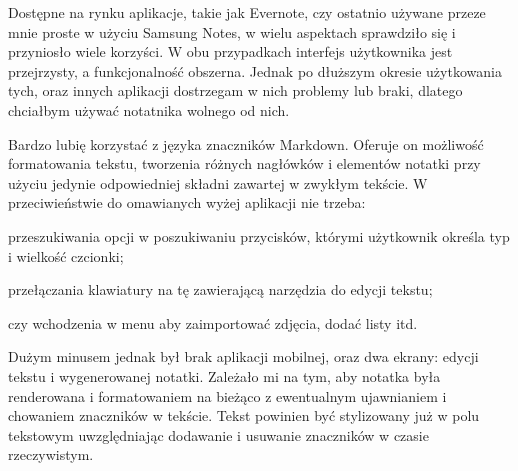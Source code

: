 \documentclass[shortabstract]{iithesis}
\begin{document}
Dostępne na rynku aplikacje, takie jak Evernote, czy ostatnio używane przeze mnie proste w użyciu Samsung Notes, w wielu aspektach sprawdziło się i przyniosło wiele korzyści. W obu przypadkach interfejs użytkownika jest przejrzysty, a funkcjonalność obszerna. Jednak po dłuższym okresie użytkowania tych, oraz innych aplikacji dostrzegam w nich problemy lub braki, dlatego chciałbym używać notatnika wolnego od nich.

Bardzo lubię korzystać z języka znaczników Markdown. Oferuje on możliwość formatowania tekstu, tworzenia różnych nagłówków i elementów notatki przy użyciu jedynie odpowiedniej składni zawartej w zwykłym tekście. W przeciwieństwie do omawianych wyżej aplikacji nie trzeba:
\begin{compactitem}
    \item przeszukiwania opcji w poszukiwaniu przycisków, którymi użytkownik określa typ i wielkość czcionki;
    \item przełączania klawiatury na tę zawierającą narzędzia do edycji tekstu;
    \item czy wchodzenia w menu aby zaimportować zdjęcia, dodać listy itd.
\end{compactitem} 
Dużym minusem jednak był brak aplikacji mobilnej, oraz dwa ekrany: edycji tekstu i wygenerowanej notatki. Zależało mi na tym, aby notatka była renderowana i formatowaniem na bieżąco z ewentualnym ujawnianiem i chowaniem znaczników w tekście. Tekst powinien być stylizowany już w polu tekstowym uwzględniając dodawanie i usuwanie znaczników w czasie rzeczywistym.
\end{document}
